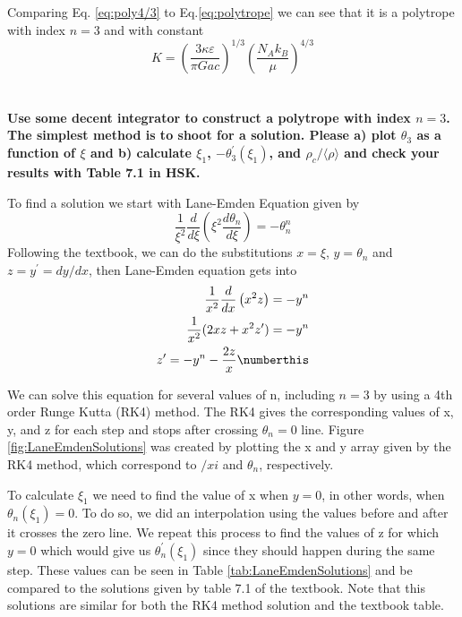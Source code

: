 Comparing Eq. \ref{eq:poly4/3} to Eq.\ref{eq:polytrope} we can see that it is a polytrope with index $n = 3$ and with constant
\begin{equation*}
    K = \left(\frac{3\kappa\varepsilon}{\pi Gac}\right)^{1/3}\left(\frac{N_A k_B}{\mu}\right)^{4/3}
\end{equation*}

\section{}
\textbf{Use some decent integrator to construct a polytrope with index $n = 3$.
The simplest method is to shoot for a solution. 
Please a) plot $\theta_3$ as a function of $\xi$ and b) calculate $\xi_1$, $-\theta_3^\prime(\xi_1)$, and $\rho_c/\langle\rho\rangle$ and check your results with Table 7.1 in HSK.}

To find a solution we start with Lane-Emden Equation given by 
\begin{equation*}
    \frac{1}{\xi^2}\frac{d}{d\xi}\left(\xi^2\frac{d\theta_n}{d\xi}\right) = -\theta_n^n
\end{equation*}
Following the textbook, we can do the substitutions $x=\xi$, $y=\theta_n$ and $z=y^\prime=dy/dx$, then Lane-Emden equation gets into
\begin{align*}
    \frac{1}{x^2}\frac{d}{dx}\left(x^2 z\right) = -y^n \\
    \frac{1}{x^2}(2xz + x^2z^\prime) =  -y^n \\
    z^\prime = -y^n - \frac{2z}{x} \numberthis \label{eq:LaneEmden}
\end{align*}

We can solve this equation for several values of n, including $n=3$ by using a 4th order Runge Kutta (RK4) method. The RK4 gives the corresponding values of x, y, and z for each step and stops after crossing $\theta_n=0$ line.
Figure \ref{fig:LaneEmdenSolutions} was created by plotting the x and y array given by the RK4 method, which correspond to $/xi$ and $\theta_n$, respectively.

To calculate $\xi_1$ we need to find the value of x when $y=0$, in other words, when $\theta_n(\xi_1)=0$. To do so, we did an interpolation using the values before and after it crosses the zero line. We repeat this process to find the values of z for which $y=0$ which would give us $\theta_n^\prime (\xi_1)$ since they should happen during the same step. These values can be seen in Table \ref{tab:LaneEmdenSolutions} and be compared to the solutions given by table 7.1 of the textbook. Note that this solutions are similar for both the RK4 method solution and the textbook table. 
  

